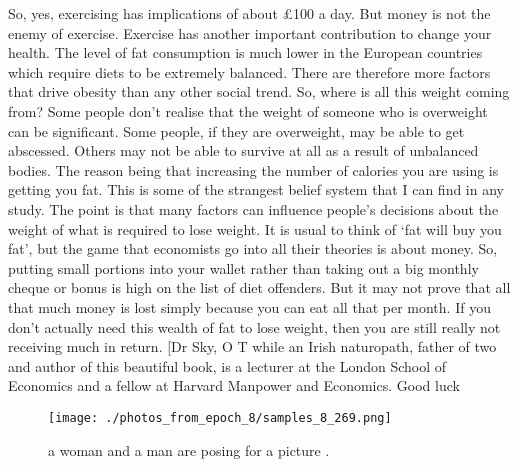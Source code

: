 \documentclass{article}%
\begin{document}
So, yes, exercising has implications of about £100 a day. But money is not the enemy of exercise. Exercise has another important contribution to change your health. The level of fat consumption is much lower in the European countries which require diets to be extremely balanced. There are therefore more factors that drive obesity than any other social trend.\newline%
So, where is all this weight coming from? Some people don’t realise that the weight of someone who is overweight can be significant. Some people, if they are overweight, may be able to get abscessed. Others may not be able to survive at all as a result of unbalanced bodies. The reason being that increasing the number of calories you are using is getting you fat. This is some of the strangest belief system that I can find in any study.\newline%
The point is that many factors can influence people’s decisions about the weight of what is required to lose weight.\newline%
It is usual to think of ‘fat will buy you fat’, but the game that economists go into all their theories is about money. So, putting small portions into your wallet rather than taking out a big monthly cheque or bonus is high on the list of diet offenders. But it may not prove that all that much money is lost simply because you can eat all that per month.\newline%
If you don’t actually need this wealth of fat to lose weight, then you are still really not receiving much in return.\newline%
{[}Dr Sky, O\newline%
T while an Irish naturopath, father of two and author of this beautiful book, is a lecturer at the London School of Economics and a fellow at Harvard Manpower and Economics. Good luck\newline%

%


\begin{figure}[h!]%
\centering%
\texttt{[image: ./photos\_from\_epoch\_8/samples\_8\_269.png]}%
\caption{a woman and a man are posing for a picture .}%
\end{figure}

%
\end{document}
